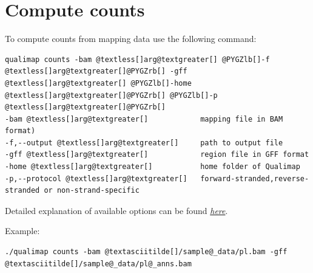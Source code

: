 \documentclass[a4paper,10pt,english]{sphinxmanual}
\begin{document}
\section{Compute counts}
\label{command_line:cmdline-counts}\label{command_line:compute-counts}
To compute counts from mapping data use the following command:

\begin{Verbatim}[commandchars=@\[\]]
qualimap counts -bam @textless[]arg@textgreater[] @PYGZlb[]-f @textless[]arg@textgreater[]@PYGZrb[] -gff @textless[]arg@textgreater[] @PYGZlb[]-home @textless[]arg@textgreater[]@PYGZrb[] @PYGZlb[]-p @textless[]arg@textgreater[]@PYGZrb[]
-bam @textless[]arg@textgreater[]            mapping file in BAM format)
-f,--output @textless[]arg@textgreater[]     path to output file
-gff @textless[]arg@textgreater[]            region file in GFF format
-home @textless[]arg@textgreater[]           home folder of Qualimap
-p,--protocol @textless[]arg@textgreater[]   forward-stranded,reverse-stranded or non-strand-specific
\end{Verbatim}

\begin{DUlineblock}{0em}
\item[] 
\item[] Detailed explanation of available options can be found {\hyperref[analysis:compute-counts]{\emph{here}}}.
\end{DUlineblock}

Example:

\begin{Verbatim}[commandchars=@\[\]]
./qualimap counts -bam @textasciitilde[]/sample@_data/pl.bam -gff @textasciitilde[]/sample@_data/pl@_anns.bam
\end{Verbatim}



\renewcommand{\indexname}{Index}
\printindex
\end{document}

